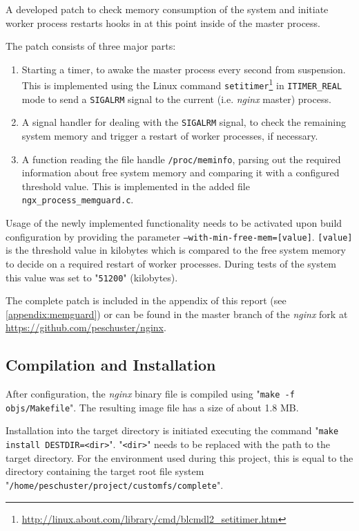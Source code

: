 A developed patch to check memory consumption of the system and initiate worker process restarts hooks in at this point inside of the master process. 

The patch consists of three major parts:

\begin{enumerate}

\item Starting a timer, to awake the master process every second from suspension. This is implemented using the Linux command \texttt{setitimer}\footnote{\url{http://linux.about.com/library/cmd/blcmdl2\_setitimer.htm}} in \texttt{ITIMER\_REAL} mode to send a \texttt{SIGALRM} signal to the current (i.e. \textit{nginx} master) process.

\item A signal handler for dealing with the \texttt{SIGALRM} signal, to check the remaining system memory and trigger a restart of worker processes, if necessary.

\item A function reading the file handle \texttt{/proc/meminfo}, parsing out the required information about free system memory and comparing it with a configured threshold value. This is implemented in the added file \texttt{ngx\_process\_memguard.c}.
\end{enumerate}

Usage of the newly implemented functionality needs to be activated upon build configuration by providing the parameter \texttt{--with-min-free-mem=[value]}. \texttt{[value]} is the threshold value in kilobytes which is compared to the free system memory to decide on a required restart of worker processes. During tests of the system this value was set to "\texttt{51200}" (kilobytes).

The complete patch is included in the appendix of this report (see \ref{appendix:memguard}) or can be found in the master branch of the \textit{nginx} fork at \url{https://github.com/peschuster/nginx}.
\\

\subsection{Compilation and Installation}

After configuration, the \textit{nginx} binary file is compiled using "\texttt{make -f objs/Makefile}". The resulting image file has a size of about 1.8 MB.

Installation into the target directory is initiated executing the command "\texttt{make install DESTDIR=<dir>}". "\texttt{<dir>}" needs to be replaced with the path to the target directory. For the environment used during this project, this is equal to the directory containing the target root file system "\texttt{/home/peschuster/project/customfs/complete}".

